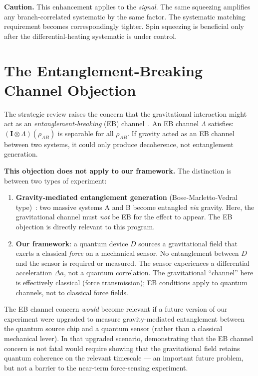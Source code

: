 \documentclass[11pt,letterpaper]{article}
\begin{document}
\textbf{Caution.} This enhancement applies to the \emph{signal}.  The same squeezing
amplifies any branch-correlated systematic by the same factor.  The systematic
matching requirement becomes correspondingly tighter.  Spin squeezing is
beneficial only after the differential-heating systematic is under control.

\section{The Entanglement-Breaking Channel Objection}

The strategic review raises the concern that the gravitational interaction might
act as an \emph{entanglement-breaking} (EB) channel~\cite{Horodecki2003}.
An EB channel $\Lambda$ satisfies: $(\mathbf{I}\otimes\Lambda)(\rho_{AB})$ is
separable for all $\rho_{AB}$.  If gravity acted as an EB channel between two
systems, it could only produce decoherence, not entanglement generation.

\textbf{This objection does not apply to our framework.}  The distinction is
between two types of experiment:

\begin{enumerate}[noitemsep]
\item \textbf{Gravity-mediated entanglement generation} (Bose-Marletto-Vedral
  type)~\cite{Bose2017}: two massive systems A and B become entangled \emph{via}
  gravity.  Here, the gravitational channel must \emph{not} be EB for the effect
  to appear.  The EB objection is directly relevant to this program.

\item \textbf{Our framework}: a quantum device $D$ sources a gravitational field
  that exerts a classical \emph{force} on a mechanical sensor.  No entanglement
  between $D$ and the sensor is required or measured.  The sensor experiences
  a differential acceleration $\Delta a$, not a quantum correlation.  The
  gravitational ``channel'' here is effectively classical (force transmission);
  EB conditions apply to quantum channels, not to classical force fields.
\end{enumerate}

The EB channel concern \emph{would} become relevant if a future version of our
experiment were upgraded to measure gravity-mediated entanglement between the
quantum source chip and a quantum sensor (rather than a classical mechanical lever).
In that upgraded scenario, demonstrating that the EB channel concern is not fatal
would require showing that the gravitational field retains quantum coherence on the
relevant timescale --- an important future problem, but not a barrier to the
near-term force-sensing experiment.
\end{document}
